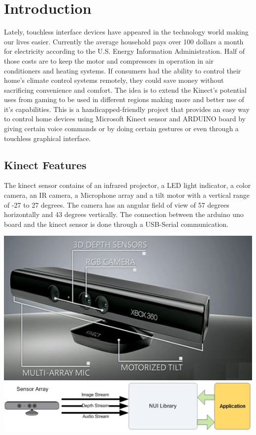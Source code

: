 \chapter{Introduction}

Lately, touchless interface devices have appeared in the technology world making our lives easier. Currently the average household pays over 100 dollars a month for electricity according to the U.S. Energy Information Administration. Half of those costs are to keep the motor and compressors in operation in air conditioners and heating systems. If consumers had the ability to control their home’s climate control systems remotely, they could save money without sacrificing convenience and comfort.
The idea is to extend the Kinect's potential uses from gaming to be used in different regions making more and better use of it's capabilities. This is a handicapped-friendly project that provides an easy way to control home devices using Microsoft Kinect sensor and ARDUINO board by giving certain voice commands or by doing certain gestures or even through a touchless graphical interface.


\section{Kinect Features}

The kinect sensor contains of an infrared projector, a LED light indicator, a color camera, an IR camera, a Microphone array and a tilt motor with a vertical range of -27 to 27 degrees.
The camera has an angular field of view of 57 degrees horizontally and 43 degrees vertically.
The connection between the arduino uno board and the kinect sensor is done through a USB-Serial communication.

  \includegraphics[scale=2]{KinectSensor.jpg}
  \includegraphics[scale=2]{KinectDataStream.png}

